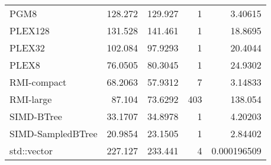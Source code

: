 \begin{tabular}{lrrrr}
 PGM8              &               128.272  &              129.927  &            1 &   3.40615     \\
 PLEX128           &               131.528  &              141.461  &            1 &  18.8695      \\
 PLEX32            &               102.084  &               97.9293 &            1 &  20.4044      \\
 PLEX8             &                76.0505 &               80.3045 &            1 &  24.9302      \\
 RMI-compact       &                68.2063 &               57.9312 &            7 &   3.14833     \\
 RMI-large         &                87.104  &               73.6292 &          403 & 138.054       \\
 SIMD-BTree        &                33.1707 &               34.8978 &            1 &   4.20203     \\
 SIMD-SampledBTree &                20.9854 &               23.1505 &            1 &   2.84402     \\
 std::vector       &               227.127  &              233.441  &            4 &   0.000196509 \\
\hline
\end{tabular}